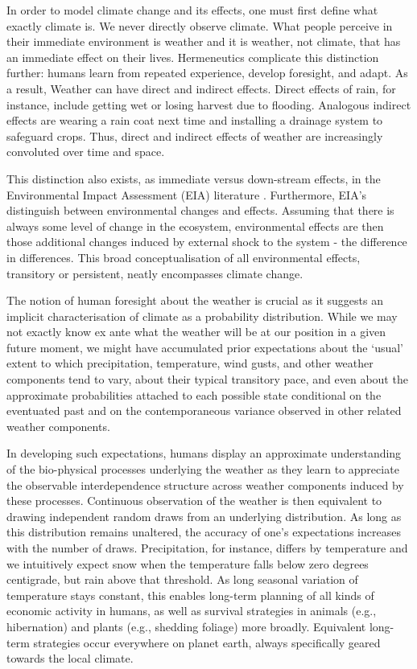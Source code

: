 \documentclass[a4paper,12pt]{article}
\theoremstyle{plain}
\theoremstyle{definition}
\theoremstyle{definition}
\theoremstyle{definition}
\theoremstyle{definition}
\begin{document}
In order to model climate change and its effects, one must first define what exactly climate is. We never directly observe climate. What people perceive in their immediate environment is weather and it is weather, not climate, that has an immediate effect on their lives. Hermeneutics complicate this distinction further: humans learn from repeated experience, develop foresight, and adapt. As a result, Weather can have direct and indirect effects. Direct effects of rain, for instance, include getting wet or losing harvest due to flooding. Analogous indirect effects are wearing a rain coat next time and installing a drainage system to safeguard crops. Thus, direct and indirect effects of weather are increasingly convoluted over time and space.

This distinction also exists, as immediate versus down-stream effects, in the Environmental Impact Assessment (EIA) literature \citep[see e.g.,][]{Noble2015}. Furthermore, EIA's distinguish between environmental changes and effects. Assuming that there is always some level of change in the ecosystem, environmental effects are then those additional changes induced by external shock to the system - the difference in differences. This broad conceptualisation of all environmental effects, transitory or persistent, neatly encompasses climate change.

The notion of human foresight about the weather is crucial as it suggests an implicit characterisation of climate as a probability distribution. While we may not exactly know ex ante what the weather will be at our position in a given future moment, we might have accumulated prior expectations about the `usual' extent to which precipitation, temperature, wind gusts, and other weather components tend to vary, about their typical transitory pace, and even about the approximate probabilities attached to each possible state conditional on the eventuated past and on the contemporaneous variance observed in other related weather components.

In developing such expectations, humans display an approximate understanding of the bio-physical processes underlying the weather as they learn to appreciate the observable interdependence structure across weather components induced by these processes. Continuous observation of the weather is then equivalent to drawing independent random draws from an underlying distribution. As long as this distribution remains unaltered, the accuracy of one's expectations increases with the number of draws. Precipitation, for instance, differs by temperature and we intuitively expect snow when the temperature falls below zero degrees centigrade, but rain above that threshold. As long seasonal variation of temperature stays constant, this enables long-term planning of all kinds of economic activity in humans, as well as survival strategies in animals (e.g., hibernation) and plants (e.g., shedding foliage) more broadly. Equivalent long-term strategies occur everywhere on planet earth, always specifically geared towards the local climate.
\end{document}
